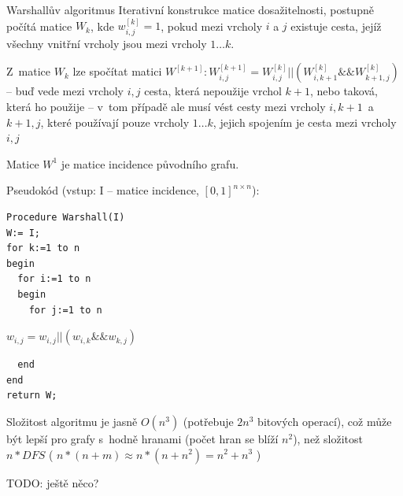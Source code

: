 \begin{obecne}{Warshallův algoritmus}
Iterativní konstrukce matice dosažitelnosti, postupně počítá matice $W_k$, kde $w^{[k]}_{i, j} = 1$, pokud mezi vrcholy $i$ a $j$ existuje cesta, jejíž všechny vnitřní vrcholy jsou mezi vrcholy $1\dots k$.

Z matice $W_k$ lze spočítat matici $W^{[k+1]}: W^{[k+1]}_{i,j} = W^{[k]}_{i,j}  || (W^{[k]}_{i,k+1} \&\& W^{[k]}_{k+1,j})$ -- buď vede mezi vrcholy $i, j$ cesta, která nepoužije vrchol $k+1$, nebo taková, která ho použije -- v tom případě ale musí vést cesty mezi vrcholy $i,k+1$ a $k+1,j$, které používají pouze vrcholy $1\dots k$, jejich spojením je cesta mezi vrcholy $i,j$

Matice $W^1$ je matice incidence původního grafu.

Pseudokód (vstup: I -- matice incidence, $[0,1]^{n\times n}$):
\begin{verbatim}
Procedure Warshall(I)
W:= I;
for k:=1 to n
begin
  for i:=1 to n
  begin
    for j:=1 to n
\end{verbatim}
      $w_{i,j} = w_{i,j} || (w_{i,k} \&\& w_{k,j})$
\begin{verbatim}
  end
end 
return W;
\end{verbatim}

Složitost algoritmu je jasně $O(n^3)$ (potřebuje $2n^3$ bitových operací), což může být lepší pro grafy s hodně hranami (počet hran se blíží $n^2$), než složitost $n*DFS$ ( $n*(n + m) ≈ n * (n + n^2) = n^2 + n^3$ )

\end{obecne}

TODO: ještě něco?
